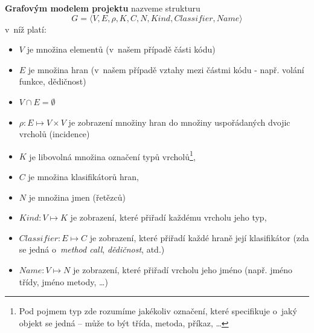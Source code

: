 \begin{definition}
\textbf{Grafovým modelem projektu} nazveme strukturu
\begin{displaymath}
  G = \langle V, E, \rho, K, C, N, \mathit{Kind}, \mathit{Classifier}, \mathit{Name}\rangle
  \label{extended_multigraph}
\end{displaymath}
v~níž platí:
\begin{itemize}
\item $V$ je množina elementů (v~našem případě části kódu)
\item $E$ je množina hran (v~našem případě vztahy mezi částmi kódu - např. volání funkce, dědičnost)
\item $V \cap E = \emptyset$
\item $\rho: E \mapsto V \times V$ je zobrazení množiny hran do množiny uspořádaných dvojic vrcholů (incidence)
\item $K$ je libovolná množina označení typů vrcholů\footnote{Pod pojmem typ zde rozumíme jakékoliv označení, které specifikuje o~jaký objekt se jedná -- může to být třída, metoda, příkaz, \ldots},
\item $C$ je množina klasifikátorů hran,
\item $N$ je množina jmen (řetězců)
\item $\mathit{Kind}: V \mapsto K$ je zobrazení, které přiřadí každému vrcholu jeho typ,
\item $\mathit{Classifier}: E \mapsto C$ je zobrazení, které přiřadí každé hraně její klasifikátor (zda se jedná o~\emph{method call}, \emph{dědičnost}, atd.)
\item $\mathit{Name}: V \mapsto N$ je zobrazení, které přiřadí vrcholu jeho jméno (např. jméno třídy, jméno metody, \ldots)
\end{itemize}
\end{definition}

